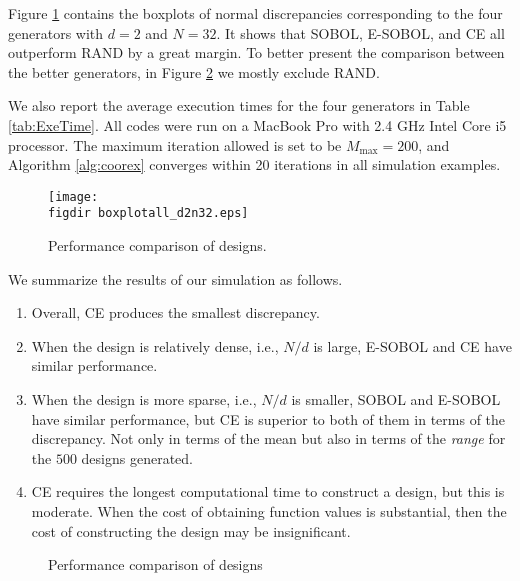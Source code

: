 \documentclass[graybox]{svmult}
\newcommand{\figdir}{code/} %
\begin{document}
Figure \ref{fig:SOBOLVsRAND} contains the boxplots of normal discrepancies corresponding to the four generators with $d=2$ and $N=32$. It shows that SOBOL, E-SOBOL, and CE all outperform RAND by a great margin. To better present the comparison between the better generators, in Figure \ref{fig:comparison} we mostly exclude RAND.

We also report the average execution times for the four generators in Table \ref{tab:ExeTime}. All codes were run on a MacBook Pro with 2.4 GHz Intel Core i5 processor. The maximum iteration allowed is set to be $M_{\max} = 200$, and  Algorithm \ref{alg:coorex} converges within 20 iterations in all simulation examples.


\begin{figure}[ht]
\begin{center}
\texttt{[image: \\figdir boxplotall\_d2n32.eps]}
\caption{Performance comparison of designs. \label{fig:SOBOLVsRAND}}
\end{center}
\end{figure}

 We summarize the results of our simulation as follows. 
\begin{enumerate}
\item
Overall, CE produces the smallest discrepancy.
\item 
When the design is relatively dense, i.e., $N/d$ is large, E-SOBOL and CE have similar performance.
\item
When the design is more sparse, i.e., $N/d$ is smaller, SOBOL and E-SOBOL have similar performance, but CE is superior to both of them in terms of the discrepancy. Not only in terms of the mean but also in terms of the \emph{range} for the $500$ designs generated.

\item CE requires the longest computational time to construct a design, but this is moderate.  When the cost of obtaining function values is substantial, then the cost of constructing the design may be insignificant.  
\end{enumerate}

\begin{figure}[ht]
\centering
{}
\quad
{}
\quad
{}
\quad
{}
\quad
{}
\quad
{}
\caption{Performance comparison of designs \label{fig:comparison}}
\end{figure}
\end{document}
